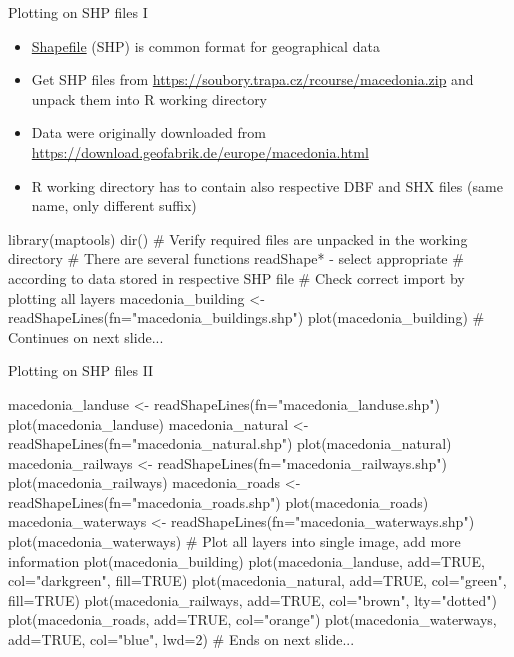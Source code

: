 \documentclass[compress, ucs, xelatex, 11pt, xcolor=svgnames,
	hyperref={
		bookmarks=true,
		unicode=true,
		colorlinks=true,
		pdftitle={Molecular data in R},
		plainpages=false,
		pdfauthor={Vojtech Zeisek},
		pdfsubject={Course about phylogeny and evolution in R},
		pdfcreator={XeLaTeX},
		pdfkeywords={R, evolution, phylogeny, molecular data},
		linkcolor=Tomato,
		anchorcolor=SaddleBrown,
		citecolor=Goldenrod,
		filecolor=DarkMagenta,
		menucolor=Sienna,
		urlcolor=DarkTurquoise,
		pdftex},
	url={hyphens, lowtilde} %
	]{beamer}
\begin{document}
\begin{frame}[fragile]{Plotting on SHP files I}
	\begin{itemize}
		\item \href{https://en.wikipedia.org/wiki/Shapefile}{Shapefile} (SHP) is common format for geographical data
		\item Get SHP files from \url{https://soubory.trapa.cz/rcourse/macedonia.zip} and unpack them into R working directory
		\item Data were originally downloaded from \url{https://download.geofabrik.de/europe/macedonia.html}
		\item R working directory has to contain also respective DBF and SHX files (same name, only different suffix)
	\end{itemize}
	\begin{spluscode}
    library(maptools)
    dir() # Verify required files are unpacked in the working directory
    # There are several functions readShape* - select appropriate
    # according to data stored in respective SHP file
    # Check correct import by plotting all layers
    macedonia_building <- readShapeLines(fn="macedonia_buildings.shp")
    plot(macedonia_building) # Continues on next slide...
	\end{spluscode}
\end{frame}

\begin{frame}[fragile]{Plotting on SHP files II}
	\begin{spluscode}
    macedonia_landuse <- readShapeLines(fn="macedonia_landuse.shp")
    plot(macedonia_landuse)
    macedonia_natural <- readShapeLines(fn="macedonia_natural.shp")
    plot(macedonia_natural)
    macedonia_railways <- readShapeLines(fn="macedonia_railways.shp")
    plot(macedonia_railways)
    macedonia_roads <- readShapeLines(fn="macedonia_roads.shp")
    plot(macedonia_roads)
    macedonia_waterways <- readShapeLines(fn="macedonia_waterways.shp")
    plot(macedonia_waterways)
    # Plot all layers into single image, add more information
    plot(macedonia_building)
    plot(macedonia_landuse, add=TRUE, col="darkgreen", fill=TRUE)
    plot(macedonia_natural, add=TRUE, col="green", fill=TRUE)
    plot(macedonia_railways, add=TRUE, col="brown", lty="dotted")
    plot(macedonia_roads, add=TRUE, col="orange")
    plot(macedonia_waterways, add=TRUE, col="blue", lwd=2)
    # Ends on next slide...
	\end{spluscode}
\end{frame}
\end{document}
